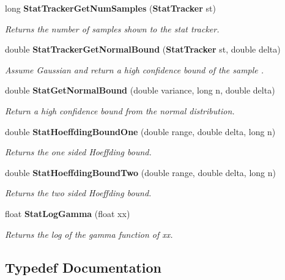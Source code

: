 \begin{CompactItemize}
long {\bf Stat\-Tracker\-Get\-Num\-Samples} ({\bf Stat\-Tracker} st)
\begin{CompactList}\small\item\em Returns the number of samples shown to the stat tracker. \item\end{CompactList}\item 
double {\bf Stat\-Tracker\-Get\-Normal\-Bound} ({\bf Stat\-Tracker} st, double delta)
\begin{CompactList}\small\item\em Assume Gaussian and return a high confidence bound of the sample . \item\end{CompactList}\item 
double {\bf Stat\-Get\-Normal\-Bound} (double variance, long n, double delta)
\begin{CompactList}\small\item\em Return a high confidence bound from the normal distribution. \item\end{CompactList}\item 
double {\bf Stat\-Hoeffding\-Bound\-One} (double range, double delta, long n)
\begin{CompactList}\small\item\em Returns the one sided Hoeffding bound. \item\end{CompactList}\item 
double {\bf Stat\-Hoeffding\-Bound\-Two} (double range, double delta, long n)
\begin{CompactList}\small\item\em Returns the two sided Hoeffding bound. \item\end{CompactList}\item 
float {\bf Stat\-Log\-Gamma} (float xx)
\begin{CompactList}\small\item\em Returns the log of the gamma function of xx. \item\end{CompactList}\end{CompactItemize}


\subsection{Typedef Documentation}
